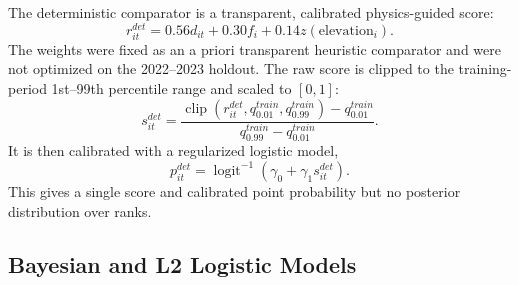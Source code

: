 \documentclass[11pt]{article}
\DeclareMathOperator{\logit}{logit}
\begin{document}
The deterministic comparator is a transparent, calibrated physics-guided score:
\begin{equation}
  r^{det}_{it}
  =
  0.56 d_{it} + 0.30 f_i + 0.14 z(\mathrm{elevation}_i).
\end{equation}
The weights were fixed as an a priori transparent heuristic comparator and were
not optimized on the 2022--2023 holdout. The raw score is clipped to the
training-period 1st--99th percentile range and scaled to $[0,1]$:
\begin{equation}
  s^{det}_{it}
  =
  \frac{
  \operatorname{clip}\left(r^{det}_{it},q^{train}_{0.01},q^{train}_{0.99}\right)
  - q^{train}_{0.01}
  }{
  q^{train}_{0.99}-q^{train}_{0.01}
  }.
\end{equation}
It is then
calibrated with a regularized logistic model,
\begin{equation}
  p^{det}_{it} = \logit^{-1}(\gamma_0+\gamma_1 s^{det}_{it}).
\end{equation}
This gives a single score and calibrated point probability but no posterior
distribution over ranks.

\subsection{Bayesian and L2 Logistic Models}
\end{document}
